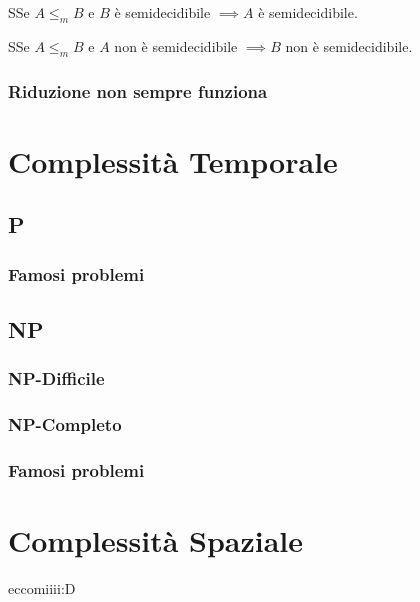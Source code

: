 \documentclass{article}  %
\theoremstyle{definition}
\begin{document}
\begin{theorem}{3.3}
  SSe $A \leq_m B$ e $B$ è semidecidibile $\implies A$ è semidecidibile. 
\end{theorem}
\begin{theorem}{3.4}
  SSe $A \leq_m B$ e $A$ non è semidecidibile $\implies B$ non è semidecidibile. 
\end{theorem}
\subsubsection{Riduzione non sempre funziona}

\section{Complessità Temporale}
\subsection{P}
\subsubsection{Famosi problemi}
\subsection{NP}
\subsubsection{NP-Difficile}
\subsubsection{NP-Completo}
\subsubsection{Famosi problemi}
\section{Complessità Spaziale}
eccomiiii:D
\end{document}
